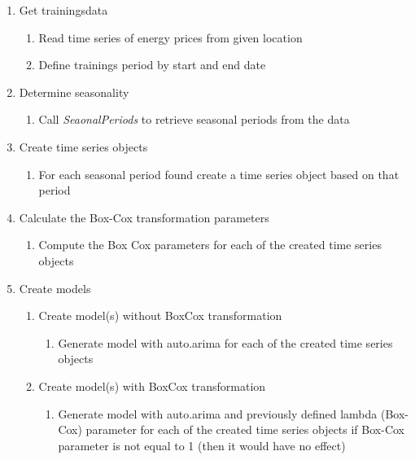 \begin{enumerate}
	\item Get trainingsdata
	
	\begin{enumerate}
		\item Read time series of energy prices from given location
		\item Define trainings period by start and end date
	\end{enumerate}
	\item Determine seasonality
	
	\begin{enumerate}
		\item Call \textit{SeaonalPeriods} to retrieve seasonal periods from the data
	\end{enumerate}
	
	\item Create time series objects
	
	\begin{enumerate}
		\item For each seasonal period found create a time series object based on that period
	\end{enumerate}
	
	\item Calculate the Box-Cox transformation parameters
	
	\begin{enumerate}
		\item Compute the Box Cox parameters for each of the created time series objects
	\end{enumerate}
	
	\item Create models
	
	\begin{enumerate}
		\item Create model(s) without BoxCox transformation
		
		\begin{enumerate}
			\item Generate model with auto.arima for each of the created time series objects 
		\end{enumerate}
		
		\item Create model(s) with BoxCox transformation
		
		\begin{enumerate}
			\item Generate model with auto.arima and previously defined lambda (Box-Cox) parameter for each of the created time series objects if Box-Cox parameter is not equal to 1 (then it would have no effect)
		

\end{enumerate}
\end{enumerate}
\end{enumerate}
